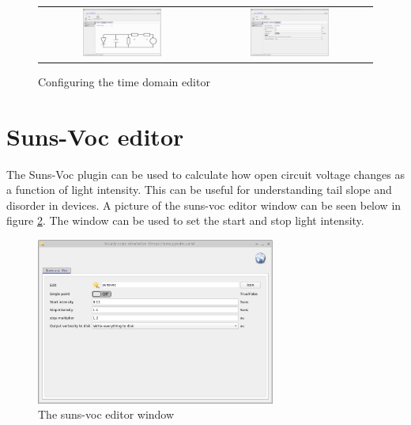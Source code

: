 \begin{figure}[H]
\centering
\begin{tabular}{ c c }

\includegraphics[width=0.5\textwidth,height=0.4\textwidth]{./images/time_domain_editor1.png}

&
\includegraphics[width=0.5\textwidth,height=0.4\textwidth]{./images/time_domain_editor4.png}

\\

\end{tabular}
\caption{Configuring the time domain editor}
\label{fig:timedomaineditor2}
\end{figure}

\section{Suns-Voc editor}
The Suns-Voc plugin can be used to calculate how open circuit voltage changes as a function of light intensity.  This can be useful for understanding tail slope and disorder in devices.  A picture of the suns-voc editor window can be seen below in figure \ref{fig:sunsvoceditor}.  The window can be used to set the start and stop light intensity.

\begin{figure}[H]
\centering
\includegraphics[width=0.7\textwidth,height=0.5\textwidth]{./images/suns_voc_editor.png}
\caption{The suns-voc editor window}
\label{fig:sunsvoceditor}
\end{figure}


